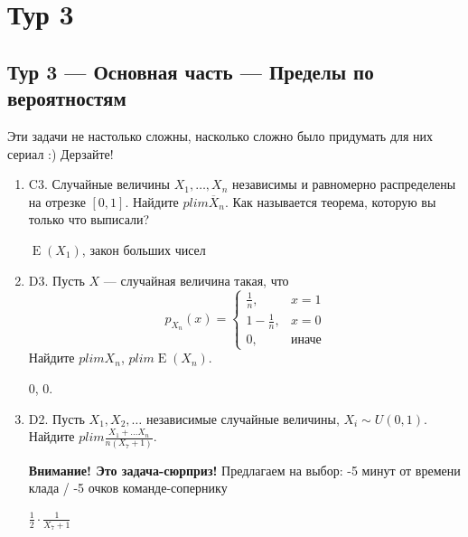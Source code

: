\documentclass[12pt]{article}
\DeclareMathOperator{\E}{E}
\newenvironment{problem}{}{}
\newenvironment{sol}{}{} %
\begin{document}
\newpage
\section{Тур 3}

\subsection{Тур 3 — Основная часть — Пределы по вероятностям}

Эти задачи не настолько сложны, насколько сложно было придумать для них сериал :) Дерзайте!


\begin{enumerate}
\begin{problem}
\item[C3.] Случайные величины $X_1, \ldots, X_n$ независимы и равномерно распределены на отрезке $[0,1]$. Найдите $plim \overline{X}_n$. Как называется теорема, которую вы только что выписали?

\begin{sol}
$\E(X_1)$, закон больших чисел
\end{sol}
\end{problem}

\begin{problem}
\item[D3.] Пусть $X$ — случайная величина такая, что
\[
p_{X_n}(x) = \begin{cases}
\frac{1}{n},  & x=1 \\
1 - \frac{1}{n}, & x=0 \\
0, & \text{иначе}
\end{cases}
\]
Найдите $plim X_n$, $plim \E(X_n)$.

\begin{sol}
$0$, $0$.
\end{sol}
\end{problem}

\begin{problem}
\item[D2.] Пусть $X_1, X_2, \ldots $ независимые случайные величины, $X_i \sim U(0,1)$. Найдите $plim \frac{X_1 + \ldots X_n}{n(X_7 + 1)}$. 

\begin{sol}
\textbf{Внимание! Это задача-сюрприз!} Предлагаем на выбор: -5 минут от времени клада / -5 очков команде-сопернику

$\frac{1}{2} \cdot \frac{1}{X_7 + 1}$


\end{sol}
\end{problem}
\end{enumerate}
\end{document}

